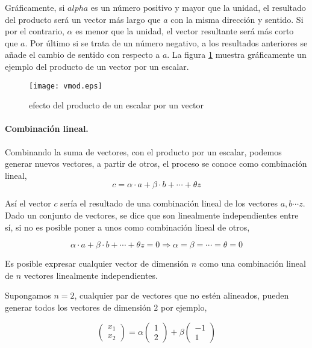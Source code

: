 Gráficamente, si $alpha$ es un número positivo y mayor que la unidad, el resultado del producto será un vector más largo que $a$ con la misma dirección y sentido. Si por el contrario, $\alpha$ es menor que la unidad, el vector resultante será más corto que $a$. Por último si se trata de un número negativo, a los resultados anteriores se añade el cambio de sentido con respecto a $a$. La figura \ref{fig:vmod} muestra gráficamente un ejemplo  del producto de un vector por un escalar.

\begin{figure}[h]
\centering
\texttt{[image: vmod.eps]}
\caption{efecto del producto de un escalar por un vector}
\label{fig:vmod}
\end{figure}

\paragraph{Combinación lineal.} Combinando la suma de vectores, con el producto por un escalar, podemos generar nuevos vectores, a partir de otros, el proceso se conoce como combinación lineal,
\begin{equation*}
c=\alpha \cdot a + \beta \cdot b + \cdots +\theta z
\end{equation*}

Así el vector $c$ sería el resultado de una combinación  lineal de los vectores $a, b \cdots z$. 
Dado un conjunto de vectores, se dice que son linealmente independientes entre sí, si no es posible poner a unos como combinación lineal de otros,

\begin{equation*}
\alpha \cdot a + \beta \cdot b + \cdots +\theta z=0 \Rightarrow \alpha =\beta =\cdots =\theta =0
\end{equation*}



Es posible expresar cualquier vector de dimensión $n$ como una combinación lineal de $n$ vectores linealmente independientes.

Supongamos $n=2$, cualquier par de vectores que no estén alineados, pueden generar todos los vectores de dimensión $2$ por ejemplo,

\begin{equation*}
\begin{pmatrix}
x_1\\
x_2
\end{pmatrix}=
\alpha \begin{pmatrix}
1\\
2
\end{pmatrix}+\beta \begin{pmatrix}
-1\\
1
\end{pmatrix}
\end{equation*}

